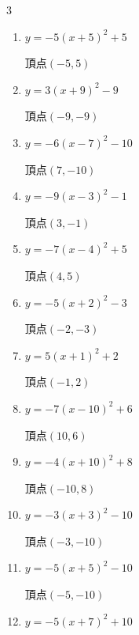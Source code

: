 \begin{multicols}{3}
\begin{enumerate}
  \item $\displaystyle y=-5\left( x+5\right)^{2}+5$

        $\displaystyle 頂点\left( -5 , 5 \right)$

  \item $\displaystyle y=3\left( x+9\right)^{2}-9$

        $\displaystyle 頂点\left( -9 , -9 \right)$

  \item $\displaystyle y=-6\left( x-7\right)^{2}-10$

        $\displaystyle 頂点\left( 7 , -10 \right)$

  \item $\displaystyle y=-9\left( x-3\right)^{2}-1$

        $\displaystyle 頂点\left( 3 , -1 \right)$

  \item $\displaystyle y=-7\left( x-4\right)^{2}+5$

        $\displaystyle 頂点\left( 4 , 5 \right)$

  \item $\displaystyle y=-5\left( x+2\right)^{2}-3$

        $\displaystyle 頂点\left( -2 , -3 \right)$

  \item $\displaystyle y=5\left( x+1\right)^{2}+2$

        $\displaystyle 頂点\left( -1 , 2 \right)$

  \item $\displaystyle y=-7\left( x-10\right)^{2}+6$

        $\displaystyle 頂点\left( 10 , 6 \right)$

  \item $\displaystyle y=-4\left( x+10\right)^{2}+8$

        $\displaystyle 頂点\left( -10 , 8 \right)$

  \item $\displaystyle y=-3\left( x+3\right)^{2}-10$

        $\displaystyle 頂点\left( -3 , -10 \right)$

  \item $\displaystyle y=-5\left( x+5\right)^{2}-10$

        $\displaystyle 頂点\left( -5 , -10 \right)$

  \item $\displaystyle y=-5\left( x+7\right)^{2}+10$


\end{enumerate}
\end{multicols}
